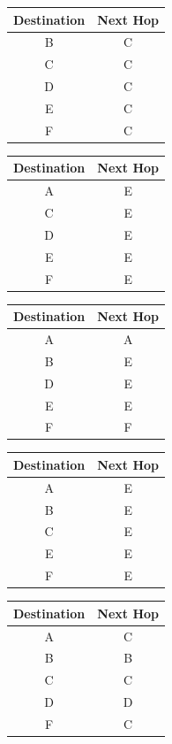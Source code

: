 \documentclass{assignment}
\begin{document}
\begin{table}[h]
\centering
\begin{tabular}{|c|c|} \hline
Destination  &  Next Hop \\ \hline
B  &  C\\
C  &  C\\
D  &  C\\
E  &  C\\
F  &  C\\ \hline
\end{tabular}
\vspace{0.5cm}
\begin{tabular}{|c|c|} \hline
Destination  &  Next Hop \\ \hline
A&  E\\
C&  E\\
D&  E\\
E&  E\\
F&  E\\ \hline
\end{tabular}
\vspace{0.5cm}
\begin{tabular}{|c|c|} \hline
Destination  &  Next Hop \\ \hline
A&  A\\
B&  E\\
D&  E\\
E&  E\\
F&  F\\ \hline
\end{tabular}
\begin{tabular}{|c|c|} \hline
Destination  &  Next Hop \\ \hline
A&  E\\
B&  E\\
C&  E\\
E&  E\\
F&  E\\ \hline
\end{tabular}
\begin{tabular}{|c|c|} \hline
Destination  &  Next Hop \\ \hline
A&  C\\
B&  B\\
C&  C\\
D&  D\\
F&  C\\ \hline

\end{tabular}
\end{table}
\end{document}
